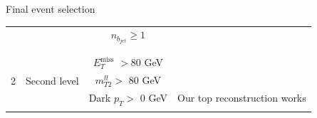\documentclass[8 pt]{beamer}
\begin{document}
\begin{frame}{Final event selection}
\begin{minipage}[c]{.97\linewidth}
\begin{center}
{\begin{tabular}{c|c|c|c}
	  & & $n_{b_{jet}} \geq 1$ & \\
	  & & & \\
	  \hline
	  & & & \\
	  \multirow{3}{*}{2} & \multirow{3}{*}{Second level} & $E_T^{\text{miss}}$ $> 80$ GeV &  \\
	  & & $m_{T2}^{ll} >$ 80 GeV &  \\
	  & &  Dark $p_T>$ 0 GeV & Our top reconstruction works \\
	  & & & \\
   \end{tabular}
   } 
   \end{center}
   \end{minipage} \hfill

\end{frame}




\end{document}
